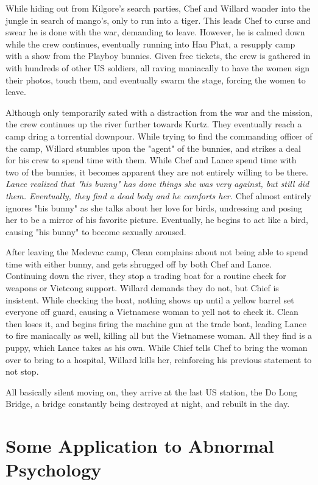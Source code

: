 \documentclass[a4paper,man,natbib]{apa6}
\begin{document}
While hiding out from Kilgore's search parties, Chef and Willard wander into the jungle in search of mango's, only to run into a tiger. This leads Chef to curse and swear he is done with the war, demanding to leave. However, he is calmed down while the crew continues, eventually running into Hau Phat, a resupply camp with a show from the Playboy bunnies. Given free tickets, the crew is gathered in with hundreds of other US soldiers, all raving maniacally to have the women sign their photos, touch them, and eventually swarm the stage, forcing the women to leave.

Although only temporarily sated with a distraction from the war and the mission, the crew continues up the river further towards Kurtz. They eventually reach a camp dring a torrential downpour. While trying to find the commanding officer of the camp, Willard stumbles upon the "agent" of the bunnies, and strikes a deal for his crew to spend time with them. While Chef and Lance spend time with two of the bunnies, it becomes apparent they are not entirely willing to be there. \textit{Lance realized that "his bunny" has done things she was very against, but still did them. Eventually, they find a dead body and he comforts her.} Chef almost entirely ignores "his bunny" as she talks about her love for birds, undressing and posing her to be a mirror of his favorite picture. Eventually, he begins to act like a bird, causing "his bunny" to become sexually aroused.

After leaving the Medevac camp, Clean complains about not being able to spend time with either bunny, and gets shrugged off by both Chef and Lance. Continuing down the river, they stop a trading boat for a routine check for weapons or Vietcong support. Willard demands they do not, but Chief is insistent. While checking the boat, nothing shows up until a yellow barrel set everyone off guard, causing a Vietnamese woman to yell not to check it. Clean then loses it, and begins firing the machine gun at the trade boat, leading Lance to fire maniacally as well, killing all but the Vietnamese woman. All they find is a puppy, which Lance takes as his own. While Chief tells Chef to bring the woman over to bring to a hospital, Willard kills her, reinforcing his previous statement to not stop.

All basically silent moving on, they arrive at the last US station, the Do Long Bridge, a bridge constantly being destroyed at night, and rebuilt in the day. 

\section{Some Application to Abnormal Psychology}
\label{sec:examples}
\end{document}

